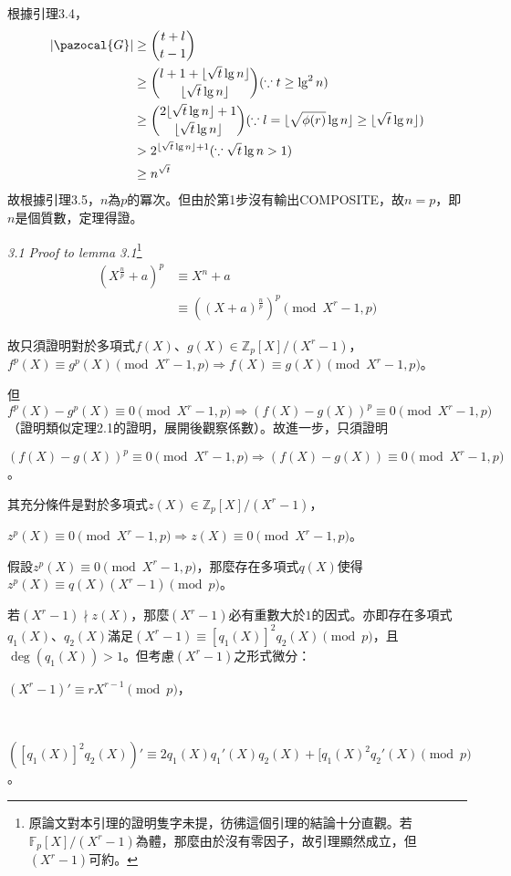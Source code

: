 \documentclass{article}
\DeclarePairedDelimiter\floor{\lfloor}{\rfloor}
\newcommand{\Gc}{\pazocal{G}}
\begin{document}
    根據引理3.4，
        \begin{align*}
        |\Gc| &\geq \binom{t+l}{t-1}\\
              &\geq \binom{l+1+\floor{\sqrt{t}\lg n}}{\floor{\sqrt{t}\lg n}}(\because t\geq \lg^2n)\\
              &\geq \binom{2\floor{\sqrt{t}\lg n}+1}{\floor{\sqrt{t}\lg n}}(\because l=\floor{\sqrt{\phi(r)}\lg n}\geq\floor{\sqrt{t}\lg n})\\
              &> 2^{\floor{\sqrt{t}\lg n}+1}(\because \sqrt{t}\lg n>1)\\
              &\geq n^{\sqrt{t}}
        \end{align*}
    故根據引理3.5，$n$為$p$的冪次。但由於第1步沒有輸出COMPOSITE，故$n=p$，即$n$是個質數，定理得證。

 \vspace{12pt} 

\noindent\textit{3.1 Proof to lemma 3.1}\footnote{原論文對本引理的證明隻字未提，彷彿這個引理的結論十分直觀。若$\mathbb{F}_p[X]/(X^r-1)$為體，那麼由於沒有零因子，故引理顯然成立，但$(X^r-1)$可約。}
    \begin{align*}
    (X^{\frac{n}{p}}+a)^p&\equiv X^n+a\\
                         &\equiv ((X+a)^{\frac{n}{p}})^p\pmod{X^r-1,p}
    \end{align*}

    故只須證明對於多項式$f(X)$、$g(X)\in \mathbb{Z}_{p}[X]/(X^r-1)$，$f^p(X)\equiv g^p(X)\pmod{X^r-1,p}\Rightarrow f(X)\equiv g(X)\pmod{X^r-1,p}$。

    但$f^p(X)-g^p(X)\equiv 0\pmod{X^r-1,p}\Rightarrow (f(X)-g(X))^p\equiv 0\pmod{X^r-1,p}$（證明類似定理2.1的證明，展開後觀察係數）。故進一步，只須證明\\
        \centerline{$(f(X)-g(X))^p\equiv 0\pmod{X^r-1,p}\Rightarrow(f(X)-g(X))\equiv 0\pmod{X^r-1,p}$。}
        
    其充分條件是對於多項式$z(X)\in\mathbb{Z}_{p}[X]/(X^r-1)$，\\
        \centerline{$z^p(X)\equiv 0\pmod{X^r-1,p}\Rightarrow z(X)\equiv 0\pmod{X^r-1,p}$。}

    假設$z^p(X)\equiv 0\pmod{X^r-1,p}$，那麼存在多項式$q(X)$使得$z^p(X)\equiv q(X)(X^r-1)\pmod{p}$。
    
    若$(X^r-1)\nmid z(X)$，那麼$(X^r-1)$必有重數大於$1$的因式。亦即存在多項式$q_1(X)$、$q_2(X)$滿足$(X^r-1)\equiv [q_1(X)]^2q_2(X)\pmod{p}$，且$\deg(q_1(X))>1$。但考慮$(X^r-1)$之形式微分：\\
        \centerline{$(X^r-1)'\equiv rX^{r-1}\pmod{p}$，}\\
        \centerline{$([q_1(X)]^2q_2(X))'\equiv 2q_1(X)q_1'(X)q_2(X)+[q_1(X)^2q_2'(X)\pmod{p}$。}
        
\end{document}
